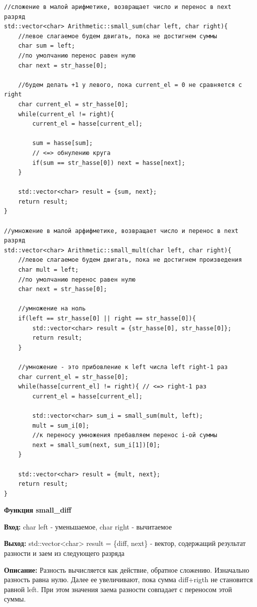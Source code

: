 \begin{lstlisting}[caption=small\_sum и small\_mult, label=lst:small-sum и small-mult]
//сложение в малой арифметике, возвращает число и перенос в next разряд 
std::vector<char> Arithmetic::small_sum(char left, char right){
    //левое слагаемое будем двигать, пока не достигнем суммы
    char sum = left;
    //по умолчанию перенос равен нулю
    char next = str_hasse[0];

    //будем делать +1 у левого, пока current_el = 0 не сравняется с right
    char current_el = str_hasse[0];
    while(current_el != right){
        current_el = hasse[current_el];

        sum = hasse[sum];
        // <=> обнулению круга
        if(sum == str_hasse[0]) next = hasse[next];
    }

    std::vector<char> result = {sum, next};
    return result;
}

//умножение в малой арфифметике, возвращает число и перенос в next разряд 
std::vector<char> Arithmetic::small_mult(char left, char right){
    //левое слагаемое будем двигать, пока не достигнем произведения
    char mult = left;
    //по умолчанию перенос равен нулю
    char next = str_hasse[0];

    //умножение на ноль
    if(left == str_hasse[0] || right == str_hasse[0]){
        std::vector<char> result = {str_hasse[0], str_hasse[0]};
        return result;
    }

    //умножение - это прибовление к left числа left right-1 раз
    char current_el = str_hasse[0];
    while(hasse[current_el] != right){ // <=> right-1 раз
        current_el = hasse[current_el];

        std::vector<char> sum_i = small_sum(mult, left);
        mult = sum_i[0];
        //к переносу умножения пребавляем перенос i-ой суммы
        next = small_sum(next, sum_i[1])[0];
    }

    std::vector<char> result = {mult, next};
    return result;
}
\end{lstlisting}

\textbf{Функция small\_diff } \par
\textbf{Вход:} char left - уменьшаемое, char right - вычитаемое \par
\textbf{Выход:} std::vector<char> result = \{diff, next\} - вектор, содержащий результат разности и заем из следующего разряда \par
\textbf{Описание:} Разность вычисляется как действие, обратное сложению. Изначально разность равна нулю. Далее ее увеличивают, пока сумма diff+rigth не становится равной left. При этом значения заема разности совпадает с переносом этой суммы.\par
\vspace{10pt}

